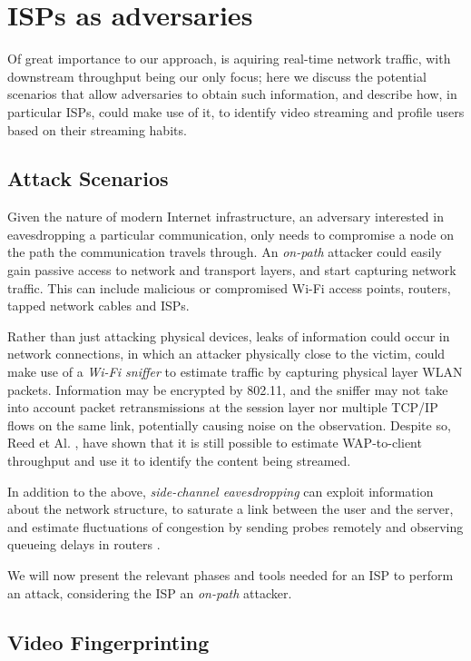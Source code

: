 \chapter{ISPs as adversaries}\label{sec:attack_isp}

Of great importance to our approach, is aquiring real-time network traffic,
with downstream throughput being our only focus; here we discuss the potential
scenarios that allow adversaries to obtain such information, and describe how,
in particular ISPs, could make use of it, to identify video streaming and
profile users based on their streaming habits.

\section{Attack Scenarios}\label{attack_scenarios}

Given the nature of modern Internet infrastructure, an adversary interested in
eavesdropping a particular communication, only needs to compromise a node on
the path the communication travels through. An \emph{on-path} attacker could
easily gain passive access to network and transport layers, and start capturing
network traffic. This can include malicious or compromised Wi-Fi access
points, routers, tapped network cables and ISPs. 

Rather than just attacking physical devices, leaks of information could occur
in network connections, in which an attacker physically close to the victim,
could make use of a \emph{Wi-Fi sniffer} to estimate traffic by capturing
physical layer WLAN packets.  Information may be encrypted by 802.11, and the
sniffer may not take into account packet retransmissions at the session layer
nor multiple TCP/IP flows on the same link, potentially causing noise on the
observation. Despite so, Reed et Al. \cite{leaky_streams}, have shown that it
is still possible to estimate WAP-to-client throughput and use it to identify
the content being streamed.

In addition to the above, \emph{side-channel eavesdropping} can exploit
information about the network structure, to saturate a link between the user
and the server, and estimate fluctuations of congestion by sending probes
remotely and observing queueing delays in routers \cite{side_channel}. 

We will now present the relevant phases and tools needed for an ISP to perform
an attack, considering the ISP an \emph{on-path} attacker.

\section{Video Fingerprinting}

